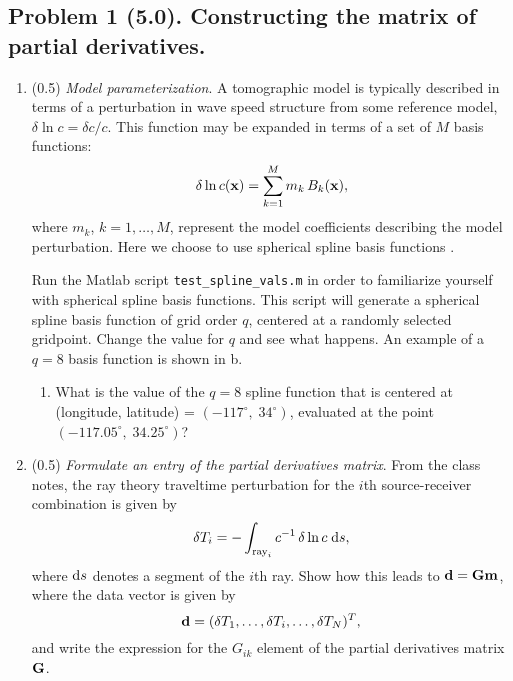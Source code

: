 \documentclass[11pt,titlepage,fleqn]{article}
\begin{document}

\subsection*{Problem 1 (5.0). Constructing the matrix of partial derivatives.}

\begin{enumerate}
\item (0.5) {\em Model parameterization}. A tomographic model is typically described in terms of a perturbation in wave speed structure from some reference model, \ie $\delta\ln c = \delta c/c$. This function may be expanded in terms of a set of $M$ basis functions:
%
\begin{equation}
\delta\ln c(\mbox{${\bf x}$})=\sum_{k=1}^M m_k\,B_k(\mbox{${\bf x}$}),
\label{dlnv}
\end{equation}
%
where $m_k$, $k=1,\ldots,M$, represent the model coefficients describing the model perturbation.  Here we choose to use spherical spline basis functions \citep{WangDahlen1995spline,Wang1998}.

Run the Matlab script \verb+test_spline_vals.m+ in order to familiarize yourself with spherical spline basis functions. This script will generate a spherical spline basis function of grid order $q$, centered at a randomly selected gridpoint.  Change the value for $q$ and see what happens.  An example of a $q = 8$ basis function is shown in b.

\begin{enumerate}
\item What is the value of the $q=8$ spline function that is centered at (longitude, latitude) = $(-117^\circ,\;34^\circ)$, evaluated at the point $(-117.05^\circ,\;34.25^\circ)$?
\end{enumerate}


\item (0.5) {\em Formulate an entry of the partial derivatives matrix}.
%
From the class notes, the ray theory traveltime perturbation for the $i$th source-receiver combination is given by
%
\begin{equation}
\delta T_i = -\int_{\mathrm{ray}_i} c^{-1}\,\delta\ln c\;\mathrm{d} s,
\label{ray_tomography}
\end{equation}
%
where $\mathrm{d} s$ denotes a segment of the $i$th ray.
Show how this leads to $\mbox{${\bf d}$} = \mbox{${\bf G}$}\mbox{${\bf m}$}$, where the data vector is given by
%
\begin{equation}
\mbox{${\bf d}$} = (\delta T_1,\ldots,\delta T_i,\ldots,\delta T_N)^T,
\label{d}
\end{equation}
%
and write the expression for the $G_{ik}$ element of the partial derivatives matrix~$\mbox{${\bf G}$}$.


\end{enumerate}
\end{document}
